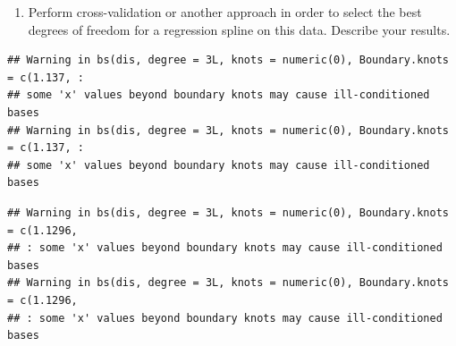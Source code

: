 \documentclass[
]{article}
\newenvironment{Shaded}{\begin{snugshade}}{\end{snugshade}}
\newcommand{\AttributeTok}[1]{\textcolor[rgb]{0.13,0.29,0.53}{#1}}
\newcommand{\CommentTok}[1]{\textcolor[rgb]{0.56,0.35,0.01}{\textit{#1}}}
\newcommand{\ControlFlowTok}[1]{\textcolor[rgb]{0.13,0.29,0.53}{\textbf{#1}}}
\newcommand{\DecValTok}[1]{\textcolor[rgb]{0.00,0.00,0.81}{#1}}
\newcommand{\FunctionTok}[1]{\textcolor[rgb]{0.13,0.29,0.53}{\textbf{#1}}}
\newcommand{\NormalTok}[1]{#1}
\newcommand{\OtherTok}[1]{\textcolor[rgb]{0.56,0.35,0.01}{#1}}
\newcommand{\SpecialCharTok}[1]{\textcolor[rgb]{0.81,0.36,0.00}{\textbf{#1}}}
\newcommand{\StringTok}[1]{\textcolor[rgb]{0.31,0.60,0.02}{#1}}
\providecommand{\tightlist}{%
  \setlength{\itemsep}{0pt}\setlength{\parskip}{0pt}}
\begin{document}
\begin{enumerate}
\def\labelenumi{(\alph{enumi})}
\setcounter{enumi}{5}
\tightlist
\item
  Perform cross-validation or another approach in order to select the
  best degrees of freedom for a regression spline on this data. Describe
  your results.
\end{enumerate}

\begin{Shaded}
\end{Shaded}

\begin{verbatim}
## Warning in bs(dis, degree = 3L, knots = numeric(0), Boundary.knots = c(1.137, :
## some 'x' values beyond boundary knots may cause ill-conditioned bases
## Warning in bs(dis, degree = 3L, knots = numeric(0), Boundary.knots = c(1.137, :
## some 'x' values beyond boundary knots may cause ill-conditioned bases
\end{verbatim}

\begin{verbatim}
## Warning in bs(dis, degree = 3L, knots = numeric(0), Boundary.knots = c(1.1296,
## : some 'x' values beyond boundary knots may cause ill-conditioned bases
## Warning in bs(dis, degree = 3L, knots = numeric(0), Boundary.knots = c(1.1296,
## : some 'x' values beyond boundary knots may cause ill-conditioned bases
\end{verbatim}
\end{document}
